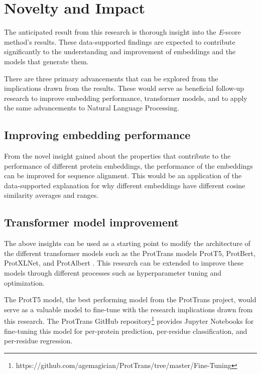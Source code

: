 \documentclass[
	letterpaper, %
	10pt, %
]{journalArticle}
\begin{document}
\section{Novelty and Impact}

The anticipated result from this research is thorough insight into the \textit{E}-score method's results. These data-supported findings are expected to contribute significantly to the understanding and improvement of embeddings and the models that generate them.

There are three primary advancements that can be explored from the implications drawn from the results. These would serve as beneficial follow-up research to improve embedding performance, transformer models, and to apply the same advancements to Natural Language Processing.

\subsection{Improving embedding performance}

From the novel insight gained about the properties that contribute to the performance of different protein embeddings, the performance of the embeddings can be improved for sequence alignment. This would be an application of the data-supported explanation for why different embeddings have different cosine similarity averages and ranges.

\subsection{Transformer model improvement}

The above insights can be used as a starting point to modify the architecture of the different transformer \autocite{Vaswani:2017} models such as the ProtTrans models ProtT5, ProtBert, ProtXLNet, and ProtAlbert \autocite{Elnaggar:2021}. This research can be extended to improve these models through different processes such as hyperparameter tuning and optimization.

The ProtT5 model, the best performing model from the ProtTrans project, would serve as a valuable model to fine-tune with the research implications drawn from this research. The ProtTrans GitHub repository\footnote{https://github.com/agemagician/ProtTrans/tree/master/Fine-Tuning} provides Jupyter Notebooks for fine-tuning this model for per-protein prediction, per-residue classification, and per-residue regression.
\end{document}
